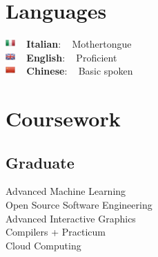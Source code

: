 \documentclass[letterpaper]{soragna-onepage-twocols} %
\begin{document}
\begin{minipage}[t]{0.33\textwidth} %



\section{Languages} 


\includegraphics[width=1em]{images/flag/Italy.png} ~ {\bf Italian}: ~ Mothertongue\\
\includegraphics[width=1em]{images/flag/United-Kingdom.png} ~ {\bf English}: ~ Proficient\\
\includegraphics[width=1em]{images/flag/China.png} ~ {\bf Chinese}: ~ Basic spoken\\


\sectionspace %


\section{Coursework}

\subsection{Graduate}

Advanced Machine Learning \\
Open Source Software Engineering \\
Advanced Interactive Graphics \\
Compilers + Practicum \\
Cloud Computing


\end{minipage}
\end{document}
